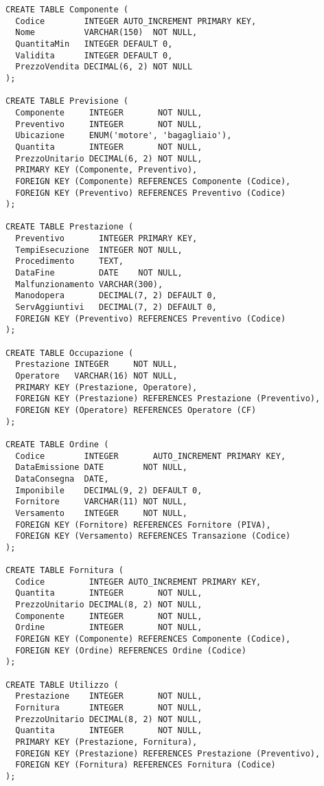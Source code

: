 \begin{lstlisting}
CREATE TABLE Componente (
  Codice        INTEGER AUTO_INCREMENT PRIMARY KEY,
  Nome          VARCHAR(150)  NOT NULL,
  QuantitaMin   INTEGER DEFAULT 0,
  Validita      INTEGER DEFAULT 0,
  PrezzoVendita DECIMAL(6, 2) NOT NULL
);

CREATE TABLE Previsione (
  Componente     INTEGER       NOT NULL,
  Preventivo     INTEGER       NOT NULL,
  Ubicazione     ENUM('motore', 'bagagliaio'),
  Quantita       INTEGER       NOT NULL,
  PrezzoUnitario DECIMAL(6, 2) NOT NULL,
  PRIMARY KEY (Componente, Preventivo),
  FOREIGN KEY (Componente) REFERENCES Componente (Codice),
  FOREIGN KEY (Preventivo) REFERENCES Preventivo (Codice)
);

CREATE TABLE Prestazione (
  Preventivo       INTEGER PRIMARY KEY,
  TempiEsecuzione  INTEGER NOT NULL,
  Procedimento     TEXT,
  DataFine         DATE    NOT NULL,
  Malfunzionamento VARCHAR(300),
  Manodopera       DECIMAL(7, 2) DEFAULT 0,
  ServAggiuntivi   DECIMAL(7, 2) DEFAULT 0,
  FOREIGN KEY (Preventivo) REFERENCES Preventivo (Codice)
);

CREATE TABLE Occupazione (
  Prestazione INTEGER     NOT NULL,
  Operatore   VARCHAR(16) NOT NULL,
  PRIMARY KEY (Prestazione, Operatore),
  FOREIGN KEY (Prestazione) REFERENCES Prestazione (Preventivo),
  FOREIGN KEY (Operatore) REFERENCES Operatore (CF)
);

CREATE TABLE Ordine (
  Codice        INTEGER       AUTO_INCREMENT PRIMARY KEY,
  DataEmissione DATE        NOT NULL,
  DataConsegna  DATE,
  Imponibile    DECIMAL(9, 2) DEFAULT 0,
  Fornitore     VARCHAR(11) NOT NULL,
  Versamento    INTEGER     NOT NULL,
  FOREIGN KEY (Fornitore) REFERENCES Fornitore (PIVA),
  FOREIGN KEY (Versamento) REFERENCES Transazione (Codice)
);

CREATE TABLE Fornitura (
  Codice         INTEGER AUTO_INCREMENT PRIMARY KEY,
  Quantita       INTEGER       NOT NULL,
  PrezzoUnitario DECIMAL(8, 2) NOT NULL,
  Componente     INTEGER       NOT NULL,
  Ordine         INTEGER       NOT NULL,
  FOREIGN KEY (Componente) REFERENCES Componente (Codice),
  FOREIGN KEY (Ordine) REFERENCES Ordine (Codice)
);

CREATE TABLE Utilizzo (
  Prestazione    INTEGER       NOT NULL,
  Fornitura      INTEGER       NOT NULL,
  PrezzoUnitario DECIMAL(8, 2) NOT NULL,
  Quantita       INTEGER       NOT NULL,
  PRIMARY KEY (Prestazione, Fornitura),
  FOREIGN KEY (Prestazione) REFERENCES Prestazione (Preventivo),
  FOREIGN KEY (Fornitura) REFERENCES Fornitura (Codice)
);


\end{lstlisting}
